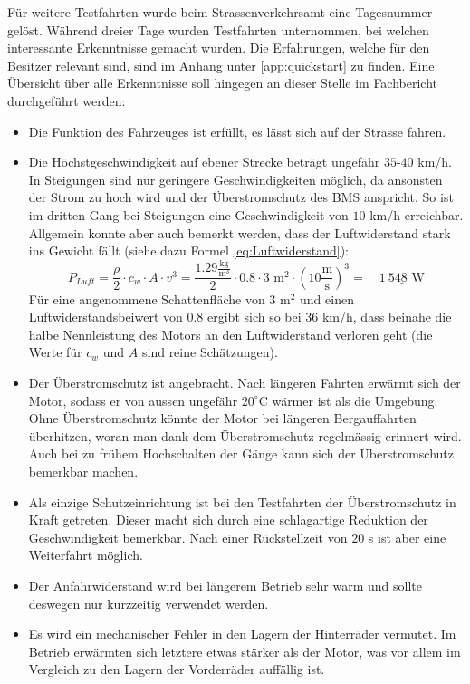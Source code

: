Für weitere Testfahrten wurde beim Strassenverkehrsamt eine Tagesnummer gelöst. Während dreier Tage wurden Testfahrten unternommen, bei welchen interessante Erkenntnisse gemacht wurden. Die Erfahrungen, welche für den Besitzer relevant sind, sind im Anhang unter \ref{app:quickstart} zu finden. Eine Übersicht über alle Erkenntnisse soll hingegen an dieser Stelle im Fachbericht durchgeführt werden: \begin{itemize}
	\item Die Funktion des Fahrzeuges ist erfüllt, es lässt sich auf der Strasse fahren.
	\item Die Höchstgeschwindigkeit auf ebener Strecke beträgt ungefähr $35$-$40$ km/h. In Steigungen sind nur geringere Geschwindigkeiten möglich, da ansonsten der Strom zu hoch wird und der Überstromschutz des BMS anspricht. So ist im dritten Gang bei Steigungen eine Geschwindigkeit von $10$ km/h erreichbar. Allgemein konnte aber auch bemerkt werden, dass der Luftwiderstand stark ins Gewicht fällt (siehe dazu Formel \ref{eq:Luftwiderstand}):
	\begin{equation}
		P_{Luft}=\frac{\rho}{2}\cdot c_w\cdot A\cdot v^3=\frac{1.29\frac{\text{kg}}{\text{m}^3}}{2}\cdot 0.8\cdot 3\text{ m}^2\cdot\left(10\frac{\text{m}}{\text{s}}\right)^3=\quad\underline{1\ 548\text{ W}}
	\label{eq:Luftwiderstand}
	\end{equation}
	Für eine angenommene Schattenfläche von $3$ m$^2$ und einen Luftwiderstandsbeiwert von 0.8 ergibt sich so bei $36$ km/h, dass beinahe die halbe Nennleistung des Motors an den Luftwiderstand verloren geht (die Werte für $c_w$ und $A$ sind reine Schätzungen).
	\item Der Überstromschutz ist angebracht. Nach längeren Fahrten erwärmt sich der Motor, sodass er von aussen ungefähr $20^\circ$C wärmer ist als die Umgebung. Ohne Überstromschutz könnte der Motor bei längeren Bergauffahrten überhitzen, woran man dank dem Überstromschutz regelmässig erinnert wird. Auch bei zu frühem Hochschalten der Gänge kann sich der Überstromschutz bemerkbar machen.
	\item Als einzige Schutzeinrichtung ist bei den Testfahrten der Überstromschutz in Kraft getreten. Dieser macht sich durch eine schlagartige Reduktion der Geschwindigkeit bemerkbar. Nach einer Rückstellzeit von $20$ s ist aber eine Weiterfahrt möglich.
	\item Der Anfahrwiderstand wird bei längerem Betrieb sehr warm und sollte deswegen nur kurzzeitig verwendet werden.
	\item Es wird ein mechanischer Fehler in den Lagern der Hinterräder vermutet. Im Betrieb erwärmten sich letztere etwas stärker als der Motor, was vor allem im Vergleich zu den Lagern der Vorderräder auffällig ist.

\end{itemize}
